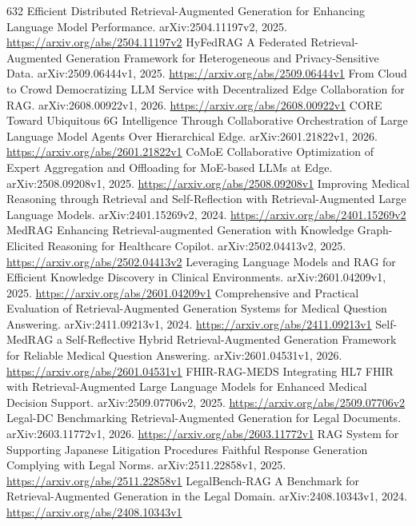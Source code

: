 \documentclass[11pt]{article}
\begin{document}
\begin{thebibliography}{632}
 Efficient Distributed Retrieval-Augmented Generation for Enhancing Language Model Performance. arXiv:2504.11197v2, 2025. \url{https://arxiv.org/abs/2504.11197v2}
 HyFedRAG A Federated Retrieval-Augmented Generation Framework for Heterogeneous and Privacy-Sensitive Data. arXiv:2509.06444v1, 2025. \url{https://arxiv.org/abs/2509.06444v1}
 From Cloud to Crowd Democratizing LLM Service with Decentralized Edge Collaboration for RAG. arXiv:2608.00922v1, 2026. \url{https://arxiv.org/abs/2608.00922v1}
 CORE Toward Ubiquitous 6G Intelligence Through Collaborative Orchestration of Large Language Model Agents Over Hierarchical Edge. arXiv:2601.21822v1, 2026. \url{https://arxiv.org/abs/2601.21822v1}
 CoMoE Collaborative Optimization of Expert Aggregation and Offloading for MoE-based LLMs at Edge. arXiv:2508.09208v1, 2025. \url{https://arxiv.org/abs/2508.09208v1}
 Improving Medical Reasoning through Retrieval and Self-Reflection with Retrieval-Augmented Large Language Models. arXiv:2401.15269v2, 2024. \url{https://arxiv.org/abs/2401.15269v2}
 MedRAG Enhancing Retrieval-augmented Generation with Knowledge Graph-Elicited Reasoning for Healthcare Copilot. arXiv:2502.04413v2, 2025. \url{https://arxiv.org/abs/2502.04413v2}
 Leveraging Language Models and RAG for Efficient Knowledge Discovery in Clinical Environments. arXiv:2601.04209v1, 2025. \url{https://arxiv.org/abs/2601.04209v1}
 Comprehensive and Practical Evaluation of Retrieval-Augmented Generation Systems for Medical Question Answering. arXiv:2411.09213v1, 2024. \url{https://arxiv.org/abs/2411.09213v1}
 Self-MedRAG a Self-Reflective Hybrid Retrieval-Augmented Generation Framework for Reliable Medical Question Answering. arXiv:2601.04531v1, 2026. \url{https://arxiv.org/abs/2601.04531v1}
 FHIR-RAG-MEDS Integrating HL7 FHIR with Retrieval-Augmented Large Language Models for Enhanced Medical Decision Support. arXiv:2509.07706v2, 2025. \url{https://arxiv.org/abs/2509.07706v2}
 Legal-DC Benchmarking Retrieval-Augmented Generation for Legal Documents. arXiv:2603.11772v1, 2026. \url{https://arxiv.org/abs/2603.11772v1}
 RAG System for Supporting Japanese Litigation Procedures Faithful Response Generation Complying with Legal Norms. arXiv:2511.22858v1, 2025. \url{https://arxiv.org/abs/2511.22858v1}
 LegalBench-RAG A Benchmark for Retrieval-Augmented Generation in the Legal Domain. arXiv:2408.10343v1, 2024. \url{https://arxiv.org/abs/2408.10343v1}

\end{thebibliography}
\end{document}
